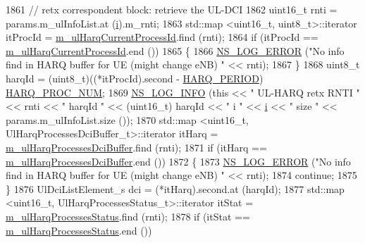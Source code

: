 \begin{DoxyCode}
1861               \textcolor{comment}{// retx correspondent block: retrieve the UL-DCI}
1862               uint16\_t rnti = params.m\_ulInfoList.at (\hyperlink{bernuolliDistribution_8m_a6f6ccfcf58b31cb6412107d9d5281426}{i}).m\_rnti;
1863               std::map <uint16\_t, uint8\_t>::iterator itProcId = 
      \hyperlink{classns3_1_1PssFfMacScheduler_a9e2a7c8f3e5e48aa429a5a06f4f70a72}{m\_ulHarqCurrentProcessId}.find (rnti);
1864               \textcolor{keywordflow}{if} (itProcId == \hyperlink{classns3_1_1PssFfMacScheduler_a9e2a7c8f3e5e48aa429a5a06f4f70a72}{m\_ulHarqCurrentProcessId}.end ())
1865                 \{
1866                   \hyperlink{group__logging_ga0261a8db1d4ac5f79417d117634fd455}{NS\_LOG\_ERROR} (\textcolor{stringliteral}{"No info find in HARQ buffer for UE (might change eNB) "} << 
      rnti);
1867                 \}
1868               uint8\_t harqId = (uint8\_t)((*itProcId).second - \hyperlink{lte-common_8h_a275321ee206f130c3ddc81fcdaa13cfd}{HARQ\_PERIOD}) %
      \hyperlink{cqa-ff-mac-scheduler_8h_a9185d8d7d2b2979181d4a7044a3d3555}{HARQ\_PROC\_NUM};
1869               \hyperlink{group__logging_gafbd73ee2cf9f26b319f49086d8e860fb}{NS\_LOG\_INFO} (\textcolor{keyword}{this} << \textcolor{stringliteral}{" UL-HARQ retx RNTI "} << rnti << \textcolor{stringliteral}{" harqId "} << (uint16\_t)
      harqId << \textcolor{stringliteral}{" i "} << \hyperlink{bernuolliDistribution_8m_a6f6ccfcf58b31cb6412107d9d5281426}{i} << \textcolor{stringliteral}{" size "}  << params.m\_ulInfoList.size ());
1870               std::map <uint16\_t, UlHarqProcessesDciBuffer\_t>::iterator itHarq = 
      \hyperlink{classns3_1_1PssFfMacScheduler_adfb2ba26a401807d40208e7b8f01f813}{m\_ulHarqProcessesDciBuffer}.find (rnti);
1871               \textcolor{keywordflow}{if} (itHarq == \hyperlink{classns3_1_1PssFfMacScheduler_adfb2ba26a401807d40208e7b8f01f813}{m\_ulHarqProcessesDciBuffer}.end ())
1872                 \{
1873                   \hyperlink{group__logging_ga0261a8db1d4ac5f79417d117634fd455}{NS\_LOG\_ERROR} (\textcolor{stringliteral}{"No info find in HARQ buffer for UE (might change eNB) "} << 
      rnti);
1874                   \textcolor{keywordflow}{continue};
1875                 \}
1876               UlDciListElement\_s dci = (*itHarq).second.at (harqId);
1877               std::map <uint16\_t, UlHarqProcessesStatus\_t>::iterator itStat = 
      \hyperlink{classns3_1_1PssFfMacScheduler_a80badd341a079bd237ef7fe60db2cb79}{m\_ulHarqProcessesStatus}.find (rnti);
1878               \textcolor{keywordflow}{if} (itStat == \hyperlink{classns3_1_1PssFfMacScheduler_a80badd341a079bd237ef7fe60db2cb79}{m\_ulHarqProcessesStatus}.end ())

\end{DoxyCode}

